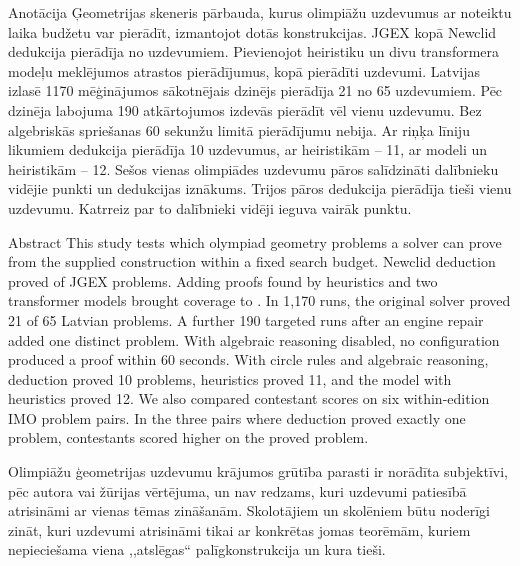 \documentclass[nolabels]{../template/zpd}
\begin{document}
\titullapa

\anotacijulapa
\begin{anotacija}{Anotācija}
Ģeometrijas skeneris pārbauda, kurus olimpiāžu uzdevumus ar noteiktu laika budžetu var pierādīt, izmantojot dotās konstrukcijas. JGEX kopā Newclid dedukcija pierādīja \jgexSolved{} no \jgexTotal{} uzdevumiem. Pievienojot heiristiku un divu transformera modeļu meklējumos atrastos pierādījumus, kopā pierādīti \jgexBest{} uzdevumi. Latvijas izlasē 1170 mēģinājumos sākotnējais dzinējs pierādīja 21 no 65 uzdevumiem. Pēc dzinēja labojuma 190 atkārtojumos izdevās pierādīt vēl vienu uzdevumu. Bez algebriskās spriešanas 60 sekunžu limitā pierādījumu nebija. Ar riņķa līniju likumiem dedukcija pierādīja 10 uzdevumus, ar heiristikām – 11, ar modeli un heiristikām – 12. Sešos vienas olimpiādes uzdevumu pāros salīdzināti dalībnieku vidējie punkti un dedukcijas iznākums. Trijos pāros dedukcija pierādīja tieši vienu uzdevumu. Katrreiz par to dalībnieki vidēji ieguva vairāk punktu.

\end{anotacija}

\begin{anotacija}{Abstract}
This study tests which olympiad geometry problems a solver can prove from the supplied construction within a fixed search budget. Newclid deduction proved \jgexSolved{} of \jgexTotal{} JGEX problems. Adding proofs found by heuristics and two transformer models brought coverage to \jgexBest{}. In 1,170 runs, the original solver proved 21 of 65 Latvian problems. A further 190 targeted runs after an engine repair added one distinct problem. With algebraic reasoning disabled, no configuration produced a proof within 60 seconds. With circle rules and algebraic reasoning, deduction proved 10 problems, heuristics proved 11, and the model with heuristics proved 12. We also compared contestant scores on six within-edition IMO problem pairs. In the three pairs where deduction proved exactly one problem, contestants scored higher on the proved problem.

\end{anotacija}

\saturs

\pamatteksts
{}
Olimpiāžu ģeometrijas uzdevumu krājumos grūtība parasti ir norādīta
subjektīvi, pēc autora vai žūrijas vērtējuma, un nav redzams, kuri uzdevumi patiesībā atrisināmi ar
vienas tēmas zināšanām. Skolotājiem un skolēniem būtu noderīgi zināt, kuri uzdevumi atrisināmi tikai
ar konkrētas jomas teorēmām, kuriem nepieciešama viena ,,atslēgas`` palīgkonstrukcija un kura tieši.
\end{document}
